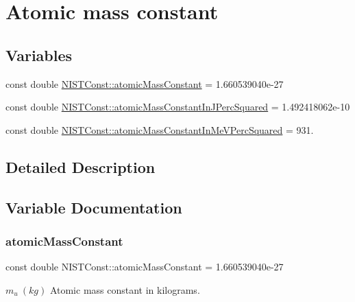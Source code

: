 \hypertarget{group___atomic_mass_constant}{}\section{Atomic mass constant}
\label{group___atomic_mass_constant}
\subsection*{Variables}
\begin{DoxyCompactItemize}
\item 
const double \hyperlink{group___atomic_mass_constant_ga2c815ce73f942601621223bef09be40a}{N\+I\+S\+T\+Const\+::atomic\+Mass\+Constant} = 1.\+660539040e-\/27
\item 
const double \hyperlink{group___atomic_mass_constant_ga59e3df8073f8ba5570bc3c9308655215}{N\+I\+S\+T\+Const\+::atomic\+Mass\+Constant\+In\+J\+Perc\+Squared} = 1.\+492418062e-\/10
\item 
const double \hyperlink{group___atomic_mass_constant_ga8bf06e408e84fc35515a4d6564407467}{N\+I\+S\+T\+Const\+::atomic\+Mass\+Constant\+In\+Me\+V\+Perc\+Squared} = 931.
\end{DoxyCompactItemize}


\subsection{Detailed Description}


\subsection{Variable Documentation}
\mbox{\label{group___atomic_mass_constant_ga2c815ce73f942601621223bef09be40a}} 
\subsubsection{\texorpdfstring{atomic\+Mass\+Constant}{atomicMassConstant}}
{\footnotesize\ttfamily const double N\+I\+S\+T\+Const\+::atomic\+Mass\+Constant = 1.\+660539040e-\/27}

$m_u \ (kg)$ Atomic mass constant in kilograms. \mbox{\label{group___atomic_mass_constant_ga59e3df8073f8ba5570bc3c9308655215}} 
